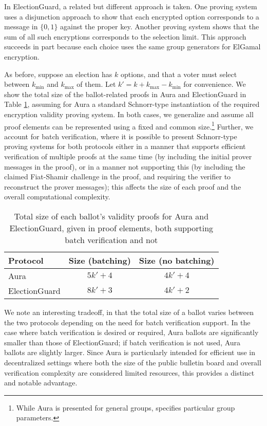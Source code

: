 \documentclass{llncs}
\begin{document}
In ElectionGuard, a related but different approach is taken.
One proving system uses a disjunction approach to show that each encrypted option corresponds to a message in $\{0,1\}$ against the proper key.
Another proving system shows that the sum of all such encryptions corresponds to the selection limit.
This approach succeeds in part because each choice uses the same group generators for ElGamal encryption.

As before, suppose an election has $k$ options, and that a voter must select between $k_{\text{min}}$ and $k_{\text{max}}$ of them.
Let $k' = k + k_{\text{max}} - k_{\text{min}}$ for convenience.
We show the total size of the ballot-related proofs in Aura and ElectionGuard in Table \ref{table:size}, assuming for Aura a standard Schnorr-type instantiation of the required encryption validity proving system.
In both cases, we generalize and assume all proof elements can be represented using a fixed and common size.\footnote{While Aura is presented for general groups, \cite{electionguard} specifies particular group parameters.}
Further, we account for batch verification, where it is possible to present Schnorr-type proving systems for both protocols either in a manner that supports efficient verification of multiple proofs at the same time (by including the initial prover messages in the proof), or in a manner not supporting this (by including the claimed Fiat-Shamir challenge in the proof, and requiring the verifier to reconstruct the prover messages); this affects the size of each proof and the overall computational complexity.

\begin{table}
    \centering
    \caption{Total size of each ballot's validity proofs for Aura and ElectionGuard, given in proof elements, both supporting batch verification and not}
    \label{table:size}
    \begin{tabular}{l|c|c|}
        Protocol & Size (batching) & Size (no batching) \\
        \hline
        Aura & $5k' + 4$ & $4k' + 4$ \\
        ElectionGuard & $8k' + 3$ & $4k' + 2$ \\
    \end{tabular}
\end{table}

We note an interesting tradeoff, in that the total size of a ballot varies between the two protocols depending on the need for batch verification support.
In the case where batch verification is desired or required, Aura ballots are significantly smaller than those of ElectionGuard; if batch verification is not used, Aura ballots are slightly larger.
Since Aura is particularly intended for efficient use in decentralized settings where both the size of the public bulletin board and overall verification complexity are considered limited resources, this provides a distinct and notable advantage.
\end{document}
